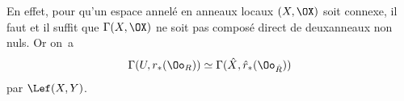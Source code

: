 En effet, pour qu'un espace annel\'e en anneaux locaux $(X, \OX)$ soit connexe, il faut et il suffit que $\Gamma(X, \OX)$ ne soit pas compos\'e direct de deux\pageoriginale anneaux non nuls. Or on~a
\[
\Gamma(U, r_\ast(\Oo_R)) \simeq \Gamma(\hat{X}, \hat{r}_\ast(\Oo_{\hat{R}}))
\]
par $\Lef(X, Y)$.

